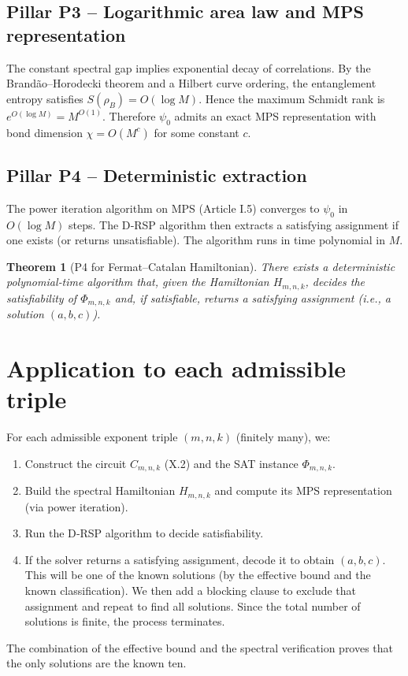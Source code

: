 \documentclass[11pt,a4paper]{article}
\newtheorem{theorem}{Theorem}[section]
\begin{document}
\subsection{Pillar P3 – Logarithmic area law and MPS representation}
The constant spectral gap implies exponential decay of correlations. By the Brandão–Horodecki theorem and a Hilbert curve ordering, the entanglement entropy satisfies \(S(\rho_B) = O(\log M)\). Hence the maximum Schmidt rank is \(e^{O(\log M)} = M^{O(1)}\). Therefore \(\psi_0\) admits an exact MPS representation with bond dimension \(\chi = O(M^c)\) for some constant \(c\).

\subsection{Pillar P4 – Deterministic extraction}
The power iteration algorithm on MPS (Article I.5) converges to \(\psi_0\) in \(O(\log M)\) steps. The D‑RSP algorithm then extracts a satisfying assignment if one exists (or returns unsatisfiable). The algorithm runs in time polynomial in \(M\).

\begin{theorem}[P4 for Fermat–Catalan Hamiltonian]
There exists a deterministic polynomial‑time algorithm that, given the Hamiltonian \(H_{m,n,k}\), decides the satisfiability of \(\Phi_{m,n,k}\) and, if satisfiable, returns a satisfying assignment (i.e., a solution \((a,b,c)\)).
\end{theorem}

\section{Application to each admissible triple}

For each admissible exponent triple \((m,n,k)\) (finitely many), we:
\begin{enumerate}
\item Construct the circuit \(C_{m,n,k}\) (X.2) and the SAT instance \(\Phi_{m,n,k}\).
\item Build the spectral Hamiltonian \(H_{m,n,k}\) and compute its MPS representation (via power iteration).
\item Run the D‑RSP algorithm to decide satisfiability.
\item If the solver returns a satisfying assignment, decode it to obtain \((a,b,c)\). This will be one of the known solutions (by the effective bound and the known classification). We then add a blocking clause to exclude that assignment and repeat to find all solutions. Since the total number of solutions is finite, the process terminates.
\end{enumerate}
The combination of the effective bound and the spectral verification proves that the only solutions are the known ten.
\end{document}
